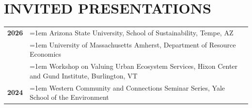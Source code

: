 \documentclass[11pt]{article}
\begin{document}
\section*{INVITED PRESENTATIONS}
\begin{longtable}{>{\bfseries}r >{\raggedright\arraybackslash\hangindent=1em\hangafter=1}p{5.8in}}%
2026 & Arizona State University, School of Sustainability, Tempe, AZ \\
    & University of Massachusetts Amherst, Department of Resource Economics \\
    & Workshop on Valuing Urban Ecosystem Services, Hixon Center and Gund Institute, Burlington, VT \\[1ex]
2024 & Western Community and Connections Seminar Series, Yale School of the Environment \\
\end{longtable}
\end{document}
